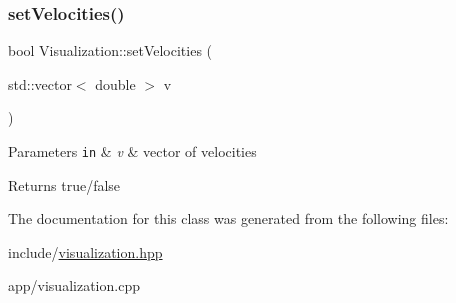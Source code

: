 \subsubsection{\texorpdfstring{set\+Velocities()}{setVelocities()}}
{\footnotesize\ttfamily bool Visualization\+::set\+Velocities (\begin{DoxyParamCaption}\item[{std\+::vector$<$ double $>$}]{v }\end{DoxyParamCaption})}


\begin{DoxyParams}[1]{Parameters}
\mbox{\tt in}  & {\em v} & vector of velocities \\
\hline
\end{DoxyParams}
\begin{DoxyReturn}{Returns}
true/false 
\end{DoxyReturn}


The documentation for this class was generated from the following files\+:\begin{DoxyCompactItemize}
\item 
include/\hyperlink{visualization_8hpp}{visualization.\+hpp}\item 
app/visualization.\+cpp\end{DoxyCompactItemize}

